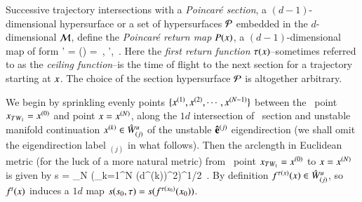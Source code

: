 Successive trajectory intersections with a {\em Poincar\'e
section}, a $(d-1)$-dim\-ens\-ion\-al hypersurface or a set of
hypersurfaces ${\cal P}$ embedded in the $d$-dim\-ens\-ion\-al
{\statesp} ${\cal M}$, define the {\em Poincar\'e return map}
$P({x})$, a $(d-1)$-dim\-ens\-ion\-al map of form
\beq
\ssp' = \PoincM({\ssp})
          =  \flow{\tau(\ssp)}{\ssp}
\,,\qquad
\ssp', \ssp \in \PoincS
\,.
Here the {\em first return function} $\tau(x)$--sometimes
referred to as the {\em ceiling function}--is the time of
flight to the next section for a trajectory starting at $x$.
The choice of the section hypersurface ${\cal P}$ is altogether
arbitrary.

We begin by sprinkling evenly points
$\{x^{(1)},x^{(2)},\cdots,x^{(N-1)}\}$ between the
\reqv\ point $x_{TW_{1}}=x^{(0)}$ and point  $x=
x^{(N)}$, along the $1d$ intersection of \Poincare\ section and
unstable manifold continuation $x^{(k)} \in \hat{W}^u_{(j)}$ of the unstable ${\bf
\hat{e}}^{(j)}$ eigen\-direction (we shall omit the
eigen\-direction label ${}_{(j)}$ in what follows). Then the
arclength in Euclidean metric (for the luck of a more natural metric) 
from \reqv\ point $x_{TW_{1}}=x^{(0)}$ to $x=
x^{(N)}$ is given by
\beq
s = \lim_{N\to\infty}
         \left(\sum_{k=1}^N \left(d\ssp^{(k)}\right)^2\right)^{1/2}
\,.
By definition $f^{\tau(x)}(x) \in \hat{W}^u_{(j)}$, so
$f^t(x)$ induces a $1d$ map $s(s_0,\tau) =
s(f^{\tau({x_0})}({x_0}))$.


